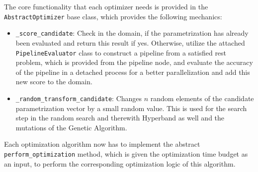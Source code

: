 The core functionality that each optimizer needs is provided in the \texttt{AbstractOptimizer} base class, which provides the following mechanics:
\begin{itemize}
    \item \texttt{\_score\_candidate}: Check in the domain, if the parametrization has already been evaluated and return this result if yes.
    Otherwise, utilize the attached \texttt{PipelineEvaluator} class to construct a pipeline from a satisfied rest problem, which is provided from the pipeline node, and evaluate the accuracy of the pipeline in a detached process for a better parallelization and add this new score to the domain.
    \item \texttt{\_random\_transform\_candidate}: Changes $n$ random elements of the candidate parametrization vector by a small random value.
    This is used for the search step in the random search and therewith Hyperband as well and the mutations of the Genetic Algorithm.
\end{itemize}
Each optimization algorithm now has to implement the abstract \texttt{perform\_optimization} method, which is given the optimization time budget as an input, to perform the corresponding optimization logic of this algorithm.

